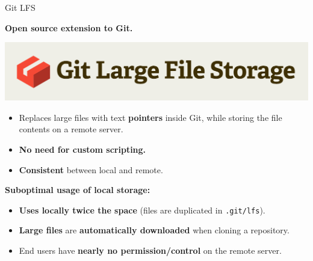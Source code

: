 \begin{frame}{Git LFS}
  \begin{minipage}{0.4\textwidth}
    \textbf{Open source extension to Git.}
  \end{minipage}%
  \hfill
  \begin{minipage}{0.6\textwidth}
    \includegraphics[width=0.8\linewidth]{images/git-lfs-logo.png}
  \end{minipage}

  \vspace{0.5cm}
  \begin{itemize}
    \item Replaces large files with text \textbf{pointers} inside Git, while storing the file contents on a remote server.
    \item \textbf{No need for custom scripting.}
    \item \textbf{Consistent} between local and remote.
  \end{itemize}

  \textbf{Suboptimal usage of local storage:}
  \begin{itemize}
    \item \textbf{Uses locally twice the space} (files are duplicated in \texttt{.git/lfs}).
    \item \textbf{Large files} are \textbf{automatically downloaded} when cloning a repository.
    \item End users have \textbf{nearly no permission/control} on the remote server.
  \end{itemize}
\end{frame}

